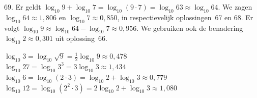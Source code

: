 \begin{problem}{69.}
	Er geldt $\log_{10} 9 + \log_{10} 7 = \log_{10} (9 \cdot 7) = \log_{10} 63 \approx \log_{10} 64$. We zagen $\log_{10} 64 \approx 1{,}806$ en $\log_{10} 7 \approx 0{,}850$, in respectievelijk oplossin\-gen~67 en 68. Er volgt $\log_{10} 9 \approx \log_{10} 64 - \log_{10} 7 \approx 0{,}956$. We gebruiken ook de benadering $\log_{10} 2 \approx 0{,}301$ uit oplossing~66.

\noindent $\log_{10} 3 = \log_{10} \sqrt{9} = \frac{1}{2} \log_{10} 9 \approx 0{,}478$\\
$\log_{10} 27 = \log_{10} 3^3 = 3 \log_{10} 3 \approx 1{,}434$\\
$\log_{10} 6 = \log_{10} (2 \cdot 3) = \log_{10} 2 + \log_{10} 3 \approx 0{,}779$\\
$\log_{10} 12 = \log_{10} (2^2 \cdot 3) = 2 \log_{10} 2 + \log_{10} 3 \approx 1{,}080$
\end{problem}

\clearpage

